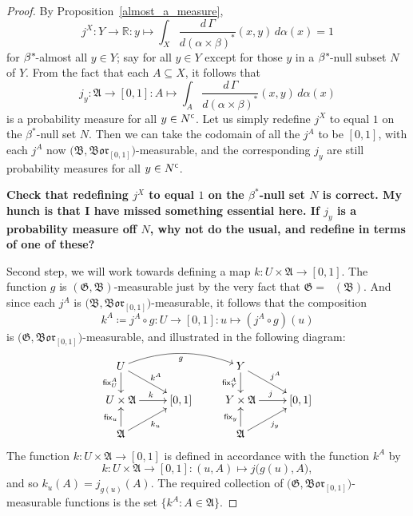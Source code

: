 \documentclass[
twoside=true,
paper=letter,
fontsize=9pt,
pagesize=auto,
leqno,
openany,
headsepline,
overfullrule,
]{scrbook}
\theoremstyle{plain}
\theoremstyle{plain}
\theoremstyle{definition}
\theoremstyle{bfnoteitalic}
\theoremstyle{bfnoteroman}
\newcommand{\sigalg}[1]{\mathfrak{#1}}
\newcommand{\definedby}{\coloneqq}
\newcommand{\sfop}[1]{\mathsf{#1}}
\newcommand{\borel}{\mathfrak{Bor}}
\newcommand{\comp}{^{\hbox{\tiny{$\mathsf C$}}}}
\newcommand{\preimage}[1]{\mathop{#1^{\leftarrow}}}
\newcommand{\R}{\mathbb{R}}
\newcommand{\sigmaalgebra}{\sigalg{A}}
\newcommand{\sigmaalgebraii}{\sigalg{B}}
\newcommand{\kernast}{\ast\kern-1pt}
\newcommand{\funcg}{g}
\newcommand{\funcj}{j}
\newcommand{\funck}{k}
\newcommand{\measurespace}{X}
\newcommand{\measurespaceii}{Y}
\newcommand{\mspaceelt}{x}
\newcommand{\mspaceeltii}{y}
\newcommand{\seti}{A}
\newcommand{\fixinthefirst}[1]{\sfop{fix}_{#1}}
\newcommand{\fixinthesecond}[1]{\sfop{fix}^{#1}}
\newcommand{\uspace}{U}%
\newcommand{\uspaceelt}{u}
\newcommand{\measonprod}{\Gamma}%
\newcommand{\marginalone}{\alpha}%
\newcommand{\marginaltwo}{\beta}%
\begin{document}
\begin{proof}
By Proposition~\ref{almost_a_measure},
\[
\funcj^\measurespace:
\measurespaceii\to\R:\mspaceeltii\mapsto
\int_\measurespace \dfrac{d\,\measonprod}{d(\marginalone\times\marginaltwo)^*}
(\mspaceelt,\mspaceeltii)
\,d\marginalone(\mspaceelt)
=
1
\]
for $\marginaltwo^\kernast$\hyp{}almost all  $\mspaceeltii\in\measurespaceii$; say for all
$\mspaceeltii\in\measurespaceii$ except for  those
$\mspaceeltii$ in a $\marginaltwo^\kernast$\hyp{}null subset $N$ of
$\measurespaceii$.
From the fact that each $\seti\subseteq\measurespace$, it follows that
\[
\funcj_\mspaceeltii :\sigmaalgebra \to [0,1]
: \seti \mapsto
\int_\seti
\dfrac{d\,\measonprod}{d(\marginalone\times\marginaltwo)^*}
(\mspaceelt,\mspaceeltii)\, d\marginalone(\mspaceelt)
\]
is a probability measure for all $\mspaceeltii\in N\comp$.
Let us simply redefine $\funcj^\measurespace$ to equal $1$ on the
$\marginaltwo^*$\hyp{}null
set $N$.  Then we can take the codomain of all the $\funcj^\seti$ to be $[0,1]$,
with each $\funcj^\seti$ now
$\bigl( \sigmaalgebraii, \borel_{[0,1]} \bigr)$\hyp{}measurable,
and the corresponding $\funcj_\mspaceeltii$ are still probability measures for all
$\mspaceeltii\in N\comp$.

\textbf{Check that redefining $\funcj^\measurespace$ to equal $1$ on the
$\marginaltwo^*$\hyp{}null
set $N$ is correct.  My hunch is that I have missed something essential here.
If $j_y$ is a probability measure off $N$, why not do the usual, and redefine in terms of one of these?}

Second step, we will work towards defining a map
$\funck: \uspace\times \sigmaalgebra \to [0,1]$.
The function $\funcg$ is
$(\sigalg{G},\sigmaalgebraii)$\hyp{}measurable just by the very fact that
$\sigalg{G} = \preimage{\funcg}(\sigmaalgebraii)$. And since each
$\funcj^\seti$ is
$\bigl( \sigmaalgebraii, \borel_{[0,1]} \bigr)$\hyp{}measurable, it follows that the composition
\[
\funck^\seti\definedby\funcj^\seti\circ\funcg
: \uspace \to [0,1]
:\uspaceelt \mapsto (\funcj^\seti\circ\funcg)(\uspaceelt)
\]
is
$\bigl( \sigalg{G}, \borel_{[0,1]} \bigr)$\hyp{}measurable, and illustrated in the following diagram:
\[%
\xymatrix@R=16pt@C=24pt{
\uspace \ar[d]_-{\fixinthesecond{\seti}_\uspace} \ar@/^12pt/[rr]_{\funcg}
\ar[dr]^{\funck^\seti}
&
& \measurespaceii \ar[d]_-{\fixinthesecond{\seti}_\measurespaceii}
\ar[dr]^{\funcj^\seti}
&
\\
\uspace\times\sigmaalgebra \ar[r]^{\funck}
& [0,1]
& \measurespaceii\times\sigmaalgebra \ar[r]^{\funcj}
& [0,1]
\\
\sigmaalgebra \ar[u]^{\fixinthefirst{\uspaceelt}}
\ar[ur]_{\funck_\uspaceelt}
&
& \sigmaalgebra \ar[u]^{\fixinthefirst{\mspaceeltii}}
\ar[ur]_{\funcj_\mspaceeltii}
&
\\
}
\]
The function
$\funck: \uspace\times \sigmaalgebra \to [0,1]$
is defined in accordance with the function $\funck^\seti$ by
\[
\funck: \uspace\times \sigmaalgebra \to [0,1] :
(\uspaceelt,\seti) \mapsto \funcj\bigl(\funcg(\uspaceelt),\seti\bigr),
\]
and so
$\funck_\uspaceelt(\seti)=\funcj_{\funcg(\uspaceelt)}(\seti)$.
The required collection of $\bigl( \sigalg{G}, \borel_{[0,1]} \bigr)$\hyp{}measurable
functions is the set $\{\funck^\seti : \seti\in\sigmaalgebra\}$.


\end{proof}
\end{document}
